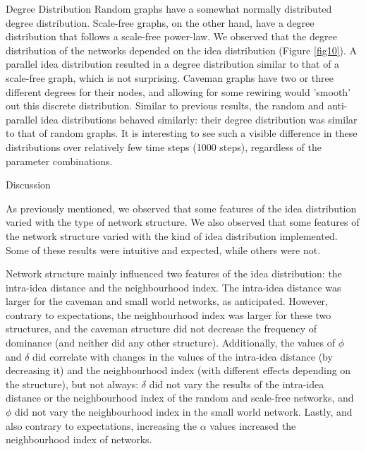 \documentclass{beamer}
\begin{document}
\begin{frame}
{Degree Distribution}
Random graphs have a somewhat normally distributed degree distribution. Scale-free graphs, on the other hand, have a degree distribution that follows a scale-free power-law. We observed that the degree distribution of the networks depended on the idea distribution (Figure \ref{fig10}). A parallel idea distribution resulted in a degree distribution similar to that of a scale-free graph, which is not surprising. Caveman graphs have two or three different degrees for their nodes, and allowing for some rewiring would 'smooth' out this discrete distribution. Similar to previous results, the random and anti-parallel idea distributions behaved similarly: their degree distribution was similar to that of random graphs. It is interesting to see such a visible difference in these distributions over relatively few time steps (1000 steps), regardless of the parameter combinations. 


{Discussion}

As previously mentioned, we observed that some features of the idea distribution varied with the type of network structure. We also observed that some features of the network structure varied with the kind of idea distribution implemented. Some of these results were intuitive and expected, while others were not.

Network structure mainly influenced two features of the idea distribution: the intra-idea distance and the neighbourhood index. The intra-idea distance was larger for the caveman and small world networks, as anticipated. However, contrary to expectations, the neighbourhood index was larger for these two structures, and the caveman structure did not decrease the frequency of dominance (and neither did any other structure).  Additionally, the values of $\phi$ and $\delta$ did correlate with changes in the values of the intra-idea distance (by decreasing it) and the neighbourhood index (with different effects depending on the structure), but not always: $\delta$ did not vary the results of the intra-idea distance or the neighbourhood index of the random and scale-free networks, and $\phi$ did not vary the neighbourhood index in the small world network. Lastly, and also contrary to expectations, increasing the $\alpha$ values increased the neighbourhood index of networks.



\end{frame}
\end{document}
